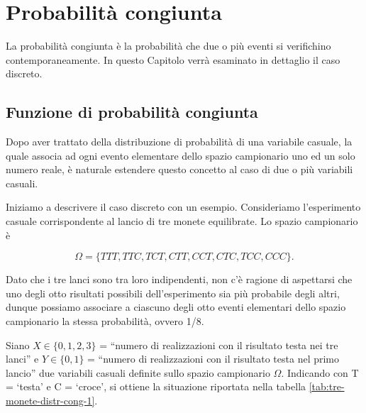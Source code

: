 \documentclass[
  11pt,
]{krantz}
\theoremstyle{definition}
\theoremstyle{definition}
\theoremstyle{definition}
\theoremstyle{definition}
\theoremstyle{remark}
\begin{document}
\hypertarget{chapter-prob-congiunta}{%
\chapter{Probabilità congiunta}\label{chapter-prob-congiunta}}

La probabilità congiunta è la probabilità che due o più eventi si verifichino contemporaneamente. In questo Capitolo verrà esaminato in dettaglio il caso discreto.

\hypertarget{funzione-di-probabilituxe0-congiunta}{%
\section{Funzione di probabilità congiunta}\label{funzione-di-probabilituxe0-congiunta}}

Dopo aver trattato della distribuzione di probabilità di una variabile casuale, la quale associa ad ogni evento elementare dello spazio campionario uno ed un solo numero reale, è naturale estendere questo concetto al caso di due o più variabili casuali.

Iniziamo a descrivere il caso discreto con un esempio. Consideriamo l'esperimento casuale corrispondente al lancio di tre monete equilibrate. Lo spazio campionario è

\[
\Omega = \{TTT, TTC, TCT, CTT, CCT, CTC, TCC, CCC\}.
\]

Dato che i tre lanci sono tra loro indipendenti, non c'è ragione di aspettarsi che uno degli otto risultati possibili dell'esperimento sia più probabile degli altri, dunque possiamo associare a ciascuno degli otto eventi elementari dello spazio campionario la stessa probabilità, ovvero 1/8.

Siano \(X \in \{0, 1, 2, 3\}\) = ``numero di realizzazioni con il risultato testa nei tre lanci'' e \(Y \in \{0, 1\}\) = ``numero di realizzazioni con il risultato testa nel primo lancio'' due variabili casuali definite sullo spazio campionario \(\Omega\). Indicando con T = `testa' e C = `croce', si ottiene la situazione riportata nella tabella \ref{tab:tre-monete-distr-cong-1}.
\end{document}
